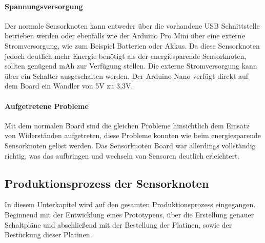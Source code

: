 \paragraph{Spannungsversorgung} Der normale Sensorknoten kann entweder über die vorhandene USB Schnittstelle betrieben werden oder ebenfalls wie der Arduino Pro Mini über eine externe Stromversorgung, wie zum Beispiel Batterien oder Akkus. Da diese Sensorknoten jedoch deutlich mehr Energie benötigt als der energiesparende Sensorknoten, sollten genügend mAh zur Verfügung stellen. Die externe Stromversorgung kann über ein Schalter ausgeschalten werden. Der Arduino Nano verfügt direkt auf dem Board ein Wandler von 5V zu 3,3V.
\paragraph{Aufgetretene Probleme} Mit dem normalen Board sind die gleichen Probleme hinsichtlich dem Einsatz von Widerständen aufgetreten, diese Probleme konnten wie beim energiesparende Sensorknoten gelöst werden. Das Sensorknoten Board war allerdings vollständig richtig, was das aufbringen und wechseln von Sensoren deutlich erleichtert.
\subsection{Produktionsprozess der Sensorknoten}
\label{sec:ProduktionsprozessSensornoten}
In diesem Unterkapitel wird auf den gesamten Produktionsprozess eingegangen. Beginnend mit der Entwicklung eines Prototypens, über die Erstellung genauer Schaltpläne und abschließend mit der Bestellung der Platinen, sowie der Bestückung dieser Platinen.
